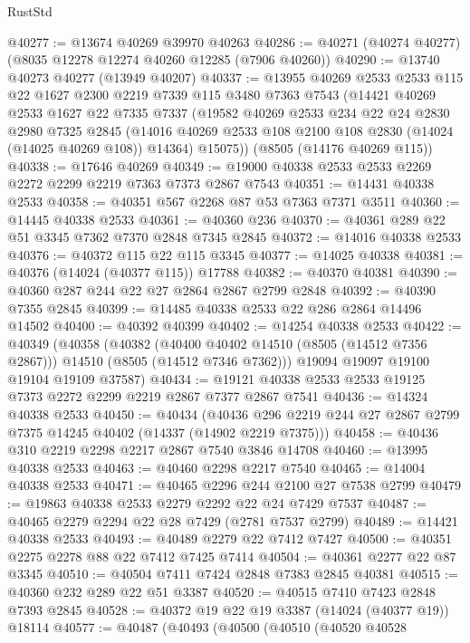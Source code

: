 \begin{lexlean}{RustStd}
\begin{coremodule}
@40277 := @13674 @40269 @39970 @40263
@40286 := @40271 (@40274 @40277) (@8035 @12278 @12274 @40260 @12285 (@7906 @40260))
@40290 := @13740 @40273 @40277 (@13949 @40207)
@40337 := @13955
    @40269
    @2533
    @2533
    @115
    @22
    @1627
    @2300
    @2219
    @7339
    @115
    @3480
    @7363
    @7543
    (@14421
      @40269
      @2533
      @1627
      @22
      @7335
      @7337
      (@19582
        @40269
        @2533
        @234
        @22
        @24
        @2830
        @2980
        @7325
        @2845
        (@14016 @40269 @2533 @108 @2100 @108 @2830 (@14024 (@14025 @40269 @108)) @14364)
        @15075))
    (@8505 (@14176 @40269 @115))
@40338 := @17646 @40269
@40349 := @19000 @40338 @2533 @2533 @2269 @2272 @2299 @2219 @7363 @7373 @2867 @7543
@40351 := @14431 @40338 @2533
@40358 := @40351 @567 @2268 @87 @53 @7363 @7371 @3511
@40360 := @14445 @40338 @2533
@40361 := @40360 @236
@40370 := @40361 @289 @22 @51 @3345 @7362 @7370 @2848 @7345 @2845
@40372 := @14016 @40338 @2533
@40376 := @40372 @115 @22 @115 @3345
@40377 := @14025 @40338
@40381 := @40376 (@14024 (@40377 @115)) @17788
@40382 := @40370 @40381
@40390 := @40360 @287 @244 @22 @27 @2864 @2867 @2799 @2848
@40392 := @40390 @7355 @2845
@40399 := @14485 @40338 @2533 @22 @286 @2864 @14496 @14502
@40400 := @40392 @40399
@40402 := @14254 @40338 @2533
@40422 := @40349
    (@40358
      (@40382
        (@40400 @40402 @14510 (@8505 (@14512 @7356 @2867)))
        @14510
        (@8505 (@14512 @7346 @7362)))
      @19094
      @19097
      @19100
      @19104
      @19109
      @37587)
@40434 := @19121 @40338 @2533 @2533 @19125 @7373 @2272 @2299 @2219 @2867 @7377 @2867 @7541
@40436 := @14324 @40338 @2533
@40450 := @40434
    (@40436 @296 @2219 @244 @27 @2867 @2799 @7375 @14245 @40402 (@14337 (@14902 @2219 @7375)))
@40458 := @40436 @310 @2219 @2298 @2217 @2867 @7540 @3846 @14708
@40460 := @13995 @40338 @2533
@40463 := @40460 @2298 @2217 @7540
@40465 := @14004 @40338 @2533
@40471 := @40465 @2296 @244 @2100 @27 @7538 @2799
@40479 := @19863 @40338 @2533 @2279 @2292 @22 @24 @7429 @7537
@40487 := @40465 @2279 @2294 @22 @28 @7429 (@2781 @7537 @2799)
@40489 := @14421 @40338 @2533
@40493 := @40489 @2279 @22 @7412 @7427
@40500 := @40351 @2275 @2278 @88 @22 @7412 @7425 @7414
@40504 := @40361 @2277 @22 @87 @3345
@40510 := @40504 @7411 @7424 @2848 @7383 @2845 @40381
@40515 := @40360 @232 @289 @22 @51 @3387
@40520 := @40515 @7410 @7423 @2848 @7393 @2845
@40528 := @40372 @19 @22 @19 @3387 (@14024 (@40377 @19)) @18114
@40577 := @40487
    (@40493
      (@40500
        (@40510
          (@40520
            @40528

\end{coremodule}
\end{lexlean}
